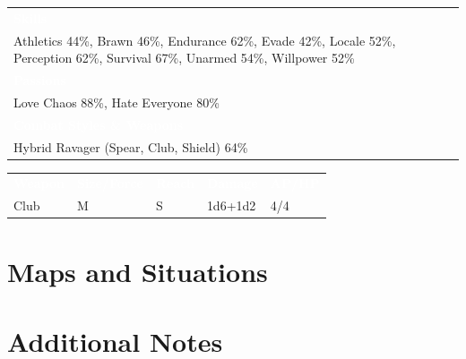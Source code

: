 \documentclass[letterpaper,serif]{rpg-module}
\begin{document}
\begin{tabularx}{\linewidth}{X}
\rowcolor{gray}
\textcolor{white}{\textbf{Skills}} \\
Athletics 44\%, Brawn 46\%, Endurance 62\%, Evade 42\%, Locale 52\%, Perception 62\%, Survival 67\%, Unarmed 54\%, Willpower 52\%\\
\rowcolor{gray}
\textcolor{white}{\textbf{Passions}} \\
Love Chaos 88\%, Hate Everyone 80\% \\
\rowcolor{gray}
\textcolor{white}{\textbf{Combat Styles \& Weapons}} \\
Hybrid Ravager (Spear, Club, Shield) 64\%
\end{tabularx}

\begin{tabularx}{\linewidth}{XXXXX}
\rowcolor{gray}
\textcolor{white}{\textbf{Weapon}} & \textcolor{white}{\textbf{Size/Force}} & \textcolor{white}{\textbf{Reach}} & \textcolor{white}{\textbf{Damage}} & \textcolor{white}{\textbf{AP/HP}} \\
Club & M & S & 1d6+1d2 & 4/4
\end{tabularx}

\section{Maps and Situations}

\section{Additional Notes}

\pagebreak

\newpage

%
%

\tableofcontents

\end{document}
